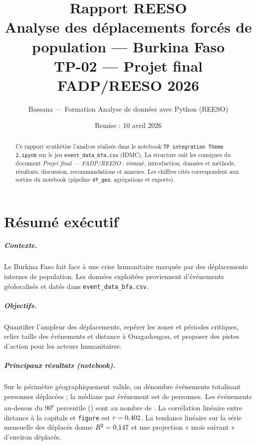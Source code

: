 \documentclass[11pt,a4paper]{report}
\title{Rapport REESO\\[0.6em]
\large Analyse des déplacements forcés de population — Burkina Faso\\
\large TP-02 — Projet final FADP/REESO 2026}
\author{Bassana — Formation Analyse de données avec Python (REESO)}
\date{Remise : 10 avril 2026}
\begin{document}
\maketitle

\begin{abstract}
\noindent
Ce rapport synthétise l'analyse réalisée dans le notebook \texttt{TP integration Theme 2.ipynb}
sur le jeu \texttt{event\_data\_bfa.csv} (IDMC). La structure suit les consignes du document
\textit{Projet final — FADP/REESO} : résumé, introduction, données et méthode, résultats,
discussion, recommandations et annexes. Les chiffres cités correspondent aux sorties du notebook
(pipeline \texttt{df\_geo}, agrégations et exports).
\end{abstract}

\tableofcontents
\clearpage


\chapter{Résumé exécutif}

\paragraph{Contexte.}
Le Burkina Faso fait face à une crise humanitaire marquée par des déplacements internes de population.
Les données exploitées proviennent d'événements géolocalisés et datés dans \texttt{event\_data\_bfa.csv}.

\paragraph{Objectifs.}
Quantifier l'ampleur des déplacements, repérer les zones et périodes critiques, relier taille des
événements et distance à Ouagadougou, et proposer des pistes d'action pour les acteurs humanitaires.

\paragraph{Principaux résultats (notebook).}
Sur le périmètre géographiquement valide, on dénombre \EventsGeo{} événements totalisant
\TotalDeplaces{} personnes déplacées ; la médiane par événement est de \MedianeEvt{} personnes.
Les événements au-dessus du 90\textsuperscript{e} percentile (\PcentQuatreVingtDix{}) sont au
nombre de \NbMassifs{}. La corrélation linéaire entre distance à la capitale et \texttt{figure}
est $r = 0{,}402{}$. La tendance linéaire sur la série mensuelle des déplacés donne
$R^2 = 0{,}147{}$ et une projection « mois suivant » d'environ \PrevisionMois{} déplacés.
\end{document}
